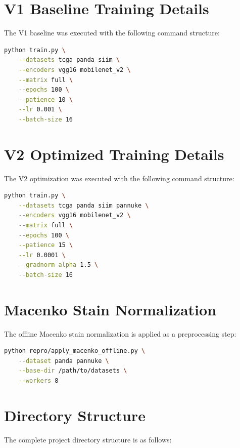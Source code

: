 \documentclass[11pt,a4paper,twoside]{report}
\begin{document}
\section{V1 Baseline Training Details}

The V1 baseline was executed with the following command structure:

\begin{lstlisting}[language=Bash, caption=V1 baseline execution command]
python train.py \
    --datasets tcga panda siim \
    --encoders vgg16 mobilenet_v2 \
    --matrix full \
    --epochs 100 \
    --patience 10 \
    --lr 0.001 \
    --batch-size 16
\end{lstlisting}

\section{V2 Optimized Training Details}

The V2 optimization was executed with the following command structure:

\begin{lstlisting}[language=Bash, caption=V2 optimized execution command]
python train.py \
    --datasets tcga panda siim pannuke \
    --encoders vgg16 mobilenet_v2 \
    --matrix full \
    --epochs 100 \
    --patience 15 \
    --lr 0.0001 \
    --gradnorm-alpha 1.5 \
    --batch-size 16
\end{lstlisting}

\section{Macenko Stain Normalization}

The offline Macenko stain normalization is applied as a preprocessing step:

\begin{lstlisting}[language=Bash, caption=Macenko stain normalization command]
python repro/apply_macenko_offline.py \
    --dataset panda pannuke \
    --base-dir /path/to/datasets \
    --workers 8
\end{lstlisting}

\section{Directory Structure}

The complete project directory structure is as follows:
\end{document}
